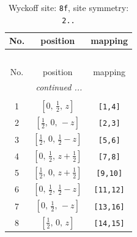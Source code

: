 \documentclass[fleqn,8pt]{jsarticle}
\begin{document}
\begin{longtable}{ccc}
\caption{Wyckoff site: {\tt 8f}, site symmetry: {\tt 2..}}
 \\
 \hline \hline
No. & position & mapping \\ \hline \endfirsthead

\multicolumn{2}{l}{\tablename\ \thetable{}} \\
 \hline \hline
No. & position & mapping \\ \hline \endhead

 \hline \hline
\multicolumn{2}{r}{\footnotesize\it continued ...} \\ \endfoot

 \hline \hline
\multicolumn{2}{r}{} \\ \endlastfoot

1 & $\left[ 0,\, \frac{1}{2},\, z \right]$ & {\tt [1,4]} \\ \hline
2 & $\left[ \frac{1}{2},\, 0,\, - z \right]$ & {\tt [2,3]} \\ \hline
3 & $\left[ \frac{1}{2},\, 0,\, \frac{1}{2} - z \right]$ & {\tt [5,6]} \\ \hline
4 & $\left[ 0,\, \frac{1}{2},\, z + \frac{1}{2} \right]$ & {\tt [7,8]} \\ \hline
5 & $\left[ \frac{1}{2},\, 0,\, z + \frac{1}{2} \right]$ & {\tt [9,10]} \\ \hline
6 & $\left[ 0,\, \frac{1}{2},\, \frac{1}{2} - z \right]$ & {\tt [11,12]} \\ \hline
7 & $\left[ 0,\, \frac{1}{2},\, - z \right]$ & {\tt [13,16]} \\ \hline
8 & $\left[ \frac{1}{2},\, 0,\, z \right]$ & {\tt [14,15]} \\
\end{longtable}
\renewcommand{\arraystretch}{1.2}
\end{document}
